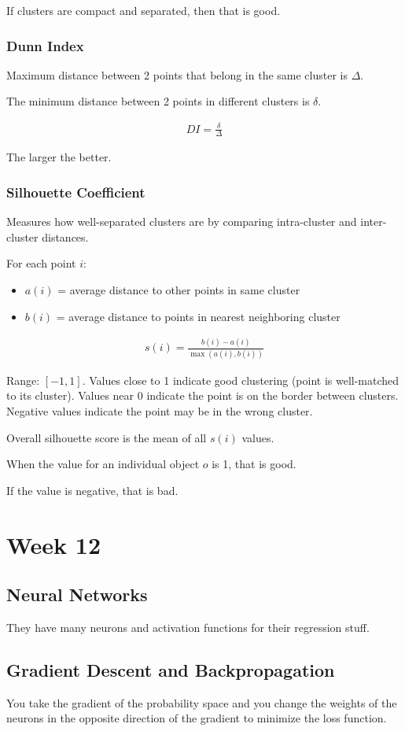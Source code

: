 \documentclass[fleqn]{report}
\newcommand{\equations} [1] {
\begin{gather*}
#1
\end{gather*}
}
\begin{document}
If clusters are compact and separated, then that is good.

\subsection{Dunn Index}
Maximum distance between 2 points that belong in 
the same cluster is $\Delta$.

The minimum distance between 2 points in different 
clusters is $\delta$.

\equations{
    DI = \frac{\delta}{\Delta}
}

The larger the better.

\subsection{Silhouette Coefficient}
Measures how well-separated clusters are by comparing 
intra-cluster and inter-cluster distances.

For each point $i$:
\begin{itemize}
    \item $a(i)$ = average distance to other points in same cluster
    \item $b(i)$ = average distance to points in nearest neighboring cluster
\end{itemize}

\equations{
    s(i) = \frac{b(i) - a(i)}{\max(a(i), b(i))}
}

Range: $[-1, 1]$. Values close to 1 indicate good clustering 
(point is well-matched to its cluster). Values near 0 indicate 
the point is on the border between clusters. Negative values 
indicate the point may be in the wrong cluster.

Overall silhouette score is the mean of all $s(i)$ values.

When the value for an individual object $o$ is 1, that 
is good. 

If the value is negative, that is bad.

\chapter{Week 12}

\section{Neural Networks}
They have many neurons and activation functions for their 
regression stuff. 

\section{Gradient Descent and Backpropagation}
You take the gradient of the probability space and you change the weights 
of the neurons in the opposite direction of the gradient to minimize the loss 
function. 
\end{document}
